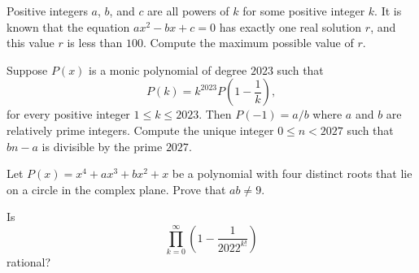 \begin{question}[name={2022 HMMT, Algebra \& Number Theory, \href{https://artofproblemsolving.com/community/c4p24651449}{Problem 1}}]
	Positive integers $a$, $b$, and $c$ are all powers of $k$ for some positive integer $k$. It is known that the equation $ax^2-bx+c=0$ has exactly one real solution $r$, and this value $r$ is less than $100$. Compute the maximum possible value of $r$.	
\end{question}


%	








\begin{question}[name={2022 HMMT, Algebra \& Number Theory, \href{https://artofproblemsolving.com/community/c4p24651863}{Problem 9}}]
	Suppose $P(x)$ is a monic polynomial of degree $2023$ such that $$P(k) = k^{2023}P\left(1-\frac{1}{k}\right),$$ for every positive integer $1 \leq k \leq 2023$. Then $P(-1) = {a}/{b}$ where $a$ and $b$ are relatively prime integers. Compute the unique integer $0 \leq n < 2027$ such that $bn-a$ is divisible by the prime $2027$.	
\end{question}


%	






\begin{question}[name={2022 HMMT, Team, \href{https://artofproblemsolving.com/community/c4p24681302}{Problem 6}}]
	Let $P(x) = x^4 + ax^3 + bx^2 + x$ be a polynomial with four distinct roots that lie on a circle in the complex plane. Prove that $ab\ne 9$.	
\end{question}


%	






\begin{question}[name={2022 HMIC, \href{https://artofproblemsolving.com/community/c4p24910314}{Problem 1}}]
	Is $$\prod_{k=0}^\infty \left(1-\frac{1}{2022^{k!}}\right)$$
	rational?
\end{question}


